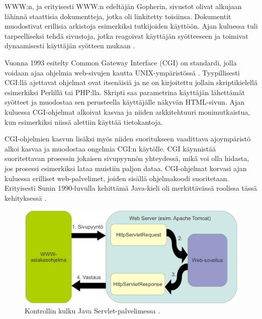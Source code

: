WWW:n, ja erityisesti WWW:n edeltäjän Gopherin, sivustot olivat alkujaan lähinnä staattisia dokumentteja, jotka oli linkitetty toisiinsa. Dokumentit muodostivat erillisia arkistoja esimerkiksi tutkijoiden käyttöön. Ajan kuluessa tuli tarpeelliseksi tehdä sivustoja, jotka reagoivat käyttäjän syötteeseen ja toimivat dynaamisesti käyttäjän syötteen mukaan \cite{dynamic}.

Vuonna 1993 esitelty Common Gateway Interface (CGI) on standardi, jolla voidaan ajaa ohjelmia web-sivujen kautta UNIX-ympäristössä \cite{rfc3875}. Tyypillisesti CGI:llä ajettavat ohjelmat ovat itsenäisiä ja ne on kirjoitettu jollain skriptikielellä esimerkiksi Perlillä tai PHP:lla. Skripti saa parametrina käyttäjän lähettämät syötteet ja muodostaa sen perusteella käyttäjälle näkyvän HTML-sivun. Ajan kuluessa CGI-ohjelmat alkoivat kasvaa ja niiden arkkitehtuuri monimutkaistua, kun esimerkiksi niissä alettiin käyttää tietokantoja.

CGI-ohjelmien kasvun lisäksi myös niiden suoritukseen vaadittava ajoympäristö alkoi kasvaa ja muodostaa ongelmia CGI:n käytölle. CGI käynnistää suoritettavan prosessin jokaisen sivupyynnön yhteydessä, mikä voi olla hidasta, jos prosessi esimerkiksi lataa muistiin paljon dataa. CGI-ohjelmat korvasi ajan kuluessa erilliset web-palvelimet, joiden sisällä ohjelmakoodi suoritetaan. Erityisesti Sunin 1990-luvulla kehittämä Java-kieli oli merkittävässä roolissa tässä kehityksessä \cite{uml}.

\begin{figure}[ht]
\centering
\includegraphics[width=\textwidth]{web/servlet.eps}
\caption{Kontrollin kulku Java Servlet-palvelimessa \cite{j2ee}.}%
\label{servlet}
\end{figure}


